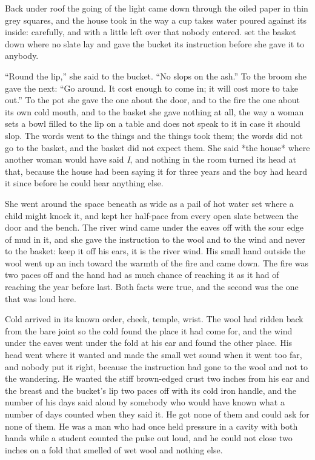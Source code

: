 Back under  roof the going of the light came down through the oiled paper in thin grey squares, and the house took  in the way a cup takes water poured against its inside: carefully, and with a little left over that nobody entered.  set the basket down where no slate lay and gave the bucket its instruction before she gave it to anybody.

“Round the lip,” she said to the bucket. “No slops on the ash.” To the broom she gave the next: “Go around. It cost enough to come in; it will cost more to take out.” To the pot she gave the one about the door, and to the fire the one about its own cold mouth, and to the basket she gave nothing at all, the way a woman sets a bowl filled to the lip on a table and does not speak to it in case it should slop. The words went to the things and the things took them; the words did not go to the basket, and the basket did not expect them. She said *the house* where another woman would have said \emph{I}, and nothing in the room turned its head at that, because the house had been saying it for three years and the boy had heard it since before he could hear anything else.

She went around the space beneath  as wide as a pail of hot water set where a child might knock it, and kept her half-pace from every open slate between the door and the bench. The river wind came under the eaves off  with the sour edge of mud in it, and she gave the instruction to the wool and to the wind and never to the basket: keep it off his ears, it is the river wind. His small hand outside the wool went up an inch toward the warmth of the fire and came down. The fire was two paces off and the hand had as much chance of reaching it as it had of reaching the year before last. Both facts were true, and the second was the one that was loud here.

Cold arrived in its known order, cheek, temple, wrist. The wool had ridden back from the bare joint so the cold found the place it had come for, and the wind under the eaves went under the fold at his ear and found the other place. His head went where it wanted and made the small wet sound when it went too far, and nobody put it right, because the instruction had gone to the wool and not to the wandering. He wanted the stiff brown-edged crust two inches from his ear and the breast and the bucket’s lip two paces off with its cold iron handle, and the number of his days said aloud by somebody who would have known what a number of days counted when they said it. He got none of them and could ask for none of them. He was a man who had once held pressure in a cavity with both hands while a student counted the pulse out loud, and he could not close two inches on a fold that smelled of wet wool and nothing else.

